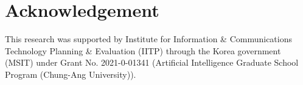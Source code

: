 \section*
{Acknowledgement}
This research was supported by Institute for Information \& Communications Technology Planning \& Evaluation (IITP) through the Korea government (MSIT) under Grant No. 2021-0-01341 (Artificial Intelligence Graduate School Program (Chung-Ang University)).